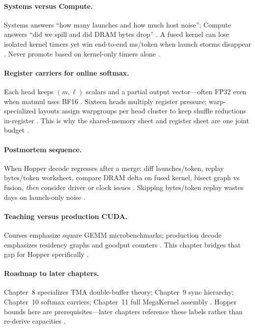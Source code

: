 \paragraph{Systems versus Compute.}
Systems answers ``how many launches and how much host noise''; Compute answers ``did we spill and did DRAM bytes drop'' \citep{patel2025llminference,semianalysis2024tma,nvidia2024cudagraphs}.
A fused kernel can lose isolated kernel timers yet win end-to-end ms/token when launch storms disappear \citep{taxbreak2026,memoryfloor2026}.
Never promote based on kernel-only timers alone \citep{patel2025llminference}.

\paragraph{Register carriers for online softmax.}
Each head keeps $(m,\ell)$ scalars and a partial output vector---often FP32 even when matmul uses BF16 \citep{dao2022flashattention,dlbook}.
Sixteen heads multiply register pressure; warp-specialized layouts assign warpgroups per head cluster to keep shuffle reductions in-register \citep{nvidia2022hopper,yirage2026,shah2024flashattention3}.
This is why the shared-memory sheet and register sheet are one joint budget \citep{memoryfloor2026}.

\paragraph{Postmortem sequence.}
When Hopper decode regresses after a merge: diff launches/token, replay bytes/token worksheet, compare DRAM delta on fused kernel, bisect graph vs fusion, \emph{then} consider driver or clock issues \citep{taxbreak2026,memoryfloor2026,patel2025llminference,nvidia2024cudagraphs}.
Skipping bytes/token replay wastes days on launch-only noise \citep{yirage2026}.

\paragraph{Teaching versus production CUDA.}
Courses emphasize square GEMM microbenchmarks; production decode emphasizes residency graphs and goodput counters \citep{dlbook,taxbreak2026,memoryfloor2026}.
This chapter bridges that gap for Hopper specifically \citep{semianalysis2024tma,nvidia2022hopper}.

\paragraph{Roadmap to later chapters.}
Chapter~8 specializes TMA double-buffer theory; Chapter~9 sync hierarchy; Chapter~10 softmax carriers; Chapter~11 full MegaKernel assembly \citep{dao2022flashattention,dao2023flashdecoding,taxbreak2026,yirage2026}.
Hopper bounds here are prerequisites---later chapters reference these labels rather than re-derive capacities \citep{nvidia2022hopper,semianalysis2024tma}.

